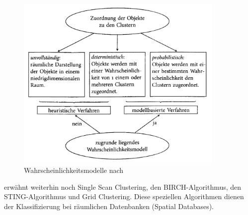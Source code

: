 \begin{figure}[h]
	\begin{center}
		\includegraphics[width=10cm]{pics/bac20.png}
	\end{center}
	\caption{Wahrscheinlichkeitsmodelle nach \citet[S. 20]{Bacher.2010}}
	\label{pic:bac20}
\end{figure}

\citet{Xu.1999} erwähnt weiterhin noch Single Scan Clustering, den BIRCH-Algorithmus, den STING-Algorithmus und Grid Clustering. Diese speziellen Algorithmen dienen der Klassifizierung bei räumlichen Datenbanken (Spatial Databases).